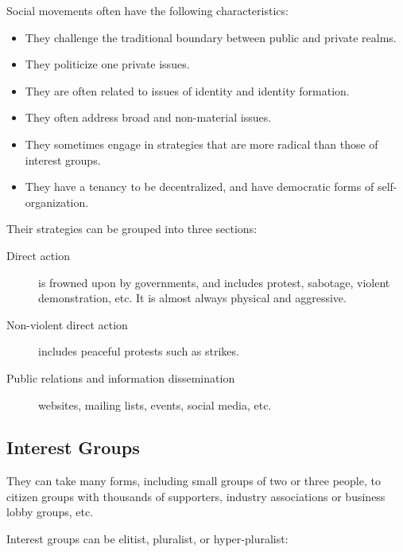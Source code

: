 Social movements often have the following characteristics:


\begin{itemize}
  \item They challenge the traditional boundary between public and private realms.
  \item They politicize one private issues.
  \item They are often related to issues of identity and identity formation.
  \item They often address broad and non-material issues.
  \item They sometimes engage in strategies that are more radical than
    those of interest groups.
  \item They have a tenancy to be decentralized, and have democratic
    forms of self-organization.
\end{itemize}


Their strategies can be grouped into three sections:
\begin{description}
  \item [Direct action] is frowned upon by governments, and includes
    protest, sabotage, violent demonstration, etc. It is almost always
    physical and aggressive.
  \item[Non-violent direct action] includes peaceful protests such as
    strikes.
  \item[Public relations and information dissemination] websites,
    mailing lists, events, social media, etc.
\end{description}

\subsection{Interest Groups}

 They can take many forms, including
small groups of two or three people, to citizen groups with thousands
of supporters, industry associations or business lobby groups, etc.

Interest groups can be elitist, pluralist, or hyper-pluralist:

